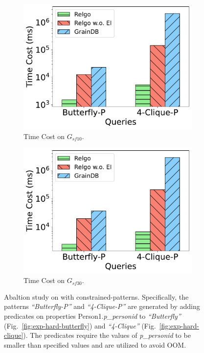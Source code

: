 \begin{figure}[ht]
    \centering
    \begin{subfigure}[b]{.45\linewidth}
        \centering
        \includegraphics[width=\linewidth]{./figures/exp/ablation_ei_para_sf10.pdf}
        \caption{Time Cost on $G_{sf10}$.}
        \label{fig:exp-ablation-para-ei-sf10}
    \end{subfigure}
    \begin{subfigure}[b]{0.45\linewidth}
        \centering
        \includegraphics[width=\linewidth]{./figures/exp/ablation_ei_para_sf30.pdf}
        \caption{Time Cost on $G_{sf30}$.}
        \label{fig:exp-ablation-para-ei-sf30}
    \end{subfigure}
    \caption{Abaltion study on \expandintersectrule with constrained-patterns. Specifically, the patterns \textit{``Butterfly-P''} and \textit{``4-Clique-P''} are generated by adding predicates on properties Person1.\textit{p\_personid} to \textit{``Butterfly''} (Fig.~\ref{fig:exp-hard-butterfly}) and \textit{``4-Clique''} (Fig.~\ref{fig:exp-hard-clique}).
    The predicates require the values of \textit{p\_personid} to be smaller than specified values and are utilized to avoid OOM.}
    \label{fig:exp-ablation-para-ei}
\end{figure}

